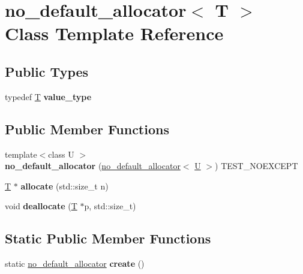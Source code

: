 \hypertarget{classno__default__allocator}{}\section{no\+\_\+default\+\_\+allocator$<$ T $>$ Class Template Reference}
\label{classno__default__allocator}
\subsection*{Public Types}
\begin{DoxyCompactItemize}
\item 
\mbox{\label{classno__default__allocator_a0d4a3b9825de43e1aaedfa8a44a49813}} 
typedef \mbox{\hyperlink{struct_t}{T}} {\bfseries value\+\_\+type}
\end{DoxyCompactItemize}
\subsection*{Public Member Functions}
\begin{DoxyCompactItemize}
\item 
\mbox{\label{classno__default__allocator_a6b6447fa5e5a7a572c2a44559a2fde6b}} 
{\footnotesize template$<$class U $>$ }\\{\bfseries no\+\_\+default\+\_\+allocator} (\mbox{\hyperlink{classno__default__allocator}{no\+\_\+default\+\_\+allocator}}$<$ \mbox{\hyperlink{union_u}{U}} $>$) T\+E\+S\+T\+\_\+\+N\+O\+E\+X\+C\+E\+PT
\item 
\mbox{\label{classno__default__allocator_a361eb5cdac59caa2f293c1a3a1656686}} 
\mbox{\hyperlink{struct_t}{T}} $\ast$ {\bfseries allocate} (std\+::size\+\_\+t n)
\item 
\mbox{\label{classno__default__allocator_a11f65ebf82a63c4feb0def7fc43f1d16}} 
void {\bfseries deallocate} (\mbox{\hyperlink{struct_t}{T}} $\ast$p, std\+::size\+\_\+t)
\end{DoxyCompactItemize}
\subsection*{Static Public Member Functions}
\begin{DoxyCompactItemize}
\item 
\mbox{\label{classno__default__allocator_a5c9c7670b44b171de20ec5f1b388bc66}} 
static \mbox{\hyperlink{classno__default__allocator}{no\+\_\+default\+\_\+allocator}} {\bfseries create} ()
\end{DoxyCompactItemize}
